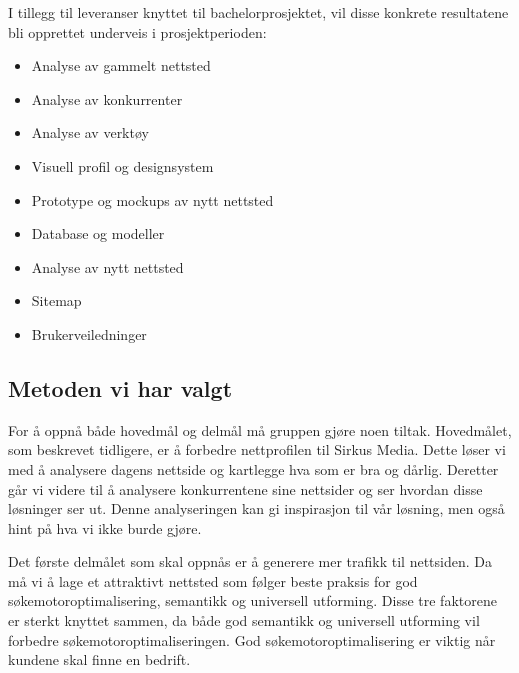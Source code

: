 
I tillegg til leveranser knyttet til bachelorprosjektet, vil disse konkrete resultatene bli opprettet underveis i prosjektperioden:
\begin{itemize}
\item Analyse av gammelt nettsted
\item Analyse av konkurrenter
\item Analyse av verktøy
\item Visuell profil og designsystem
\item Prototype og mockups av nytt nettsted
\item Database og modeller
\item Analyse av nytt nettsted
\item Sitemap
\item Brukerveiledninger
\end{itemize}

\subsection{Metoden vi har valgt}
\label{sec:metode}
For å oppnå både hovedmål og delmål må gruppen gjøre noen tiltak. Hovedmålet, som beskrevet tidligere, er å forbedre nettprofilen til Sirkus Media. Dette løser vi med å analysere dagens nettside og kartlegge hva som er bra og dårlig. Deretter går vi videre til å analysere konkurrentene sine nettsider og ser hvordan disse løsninger ser ut. Denne analyseringen kan gi inspirasjon til vår løsning, men også hint på hva vi ikke burde gjøre.

Det første delmålet som skal oppnås er å generere mer trafikk til nettsiden. Da må vi å lage et attraktivt nettsted som følger beste praksis for god søkemotoroptimalisering, semantikk og universell utforming. Disse tre faktorene er sterkt knyttet sammen, da både god semantikk og universell utforming vil forbedre søkemotoroptimaliseringen. God søkemotoroptimalisering er viktig når kundene skal finne en bedrift.

